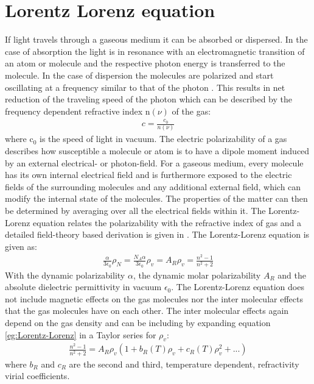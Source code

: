 \section{Lorentz Lorenz equation}
If light travels through a gaseous medium it can be absorbed or dispersed. In the case of absorption the light is in resonance with an electromagnetic transition of an atom or molecule and the respective photon energy is transferred to the molecule. In the case of dispersion the molecules are polarized and start oscillating at a frequency similar to that of the photon \cite{Jousten-2017}. This results in net reduction of the traveling speed of the photon which can be described by the frequency dependent refractive index n$(\nu)$ of the gas:
\begin{align}
	c=\frac{c_0}{n(\nu)}
	\label{eq:refractive_index}
\end{align} 
where c$_0$ is the speed of light in vacuum. The electric polarizability of a gas describes how susceptible a molecule or atom is to have a dipole moment induced by an external electrical- or photon-field. For a gaseous medium, every molecule has its own internal electrical field and is furthermore exposed to the electric fields of the surrounding molecules and any additional external field, which can modify the internal state of the molecules. The properties of the matter can then be determined by averaging over all the electrical fields within it. The Lorentz-Lorenz equation relates the polarizability with the refractive index of gas and a detailed field-theory based derivation is given in \cite{Born-1980}. The Lorentz-Lorenz equation is given as:
\begin{align}
	\frac{\alpha}{3 \epsilon_0}\rho_N=\frac{N_A\alpha}{3 \epsilon_0}\rho_v=A_R\rho_v=\frac{n^2-1}{n^2+2}
	\label{eg:Lorentz-Lorenz}
\end{align}
With the dynamic polarizability $\alpha$, the dynamic molar polarizability $A_R$ and the absolute dielectric permittivity in vacuum $\epsilon_0$. The Lorentz-Lorenz equation does not include magnetic effects on the gas  molecules nor the inter molecular effects that the gas molecules have on each other. The inter molecular effects again depend on the gas density and can be including by expanding equation \ref{eg:Lorentz-Lorenz} in a Taylor series for $\rho_v$:
\begin{align}
	\frac{n^2-1}{n^2+2}=A_R\rho_v(1+b_R(T)\rho_v+c_R(T)\rho_v^2+...)
	\label{eg:Lorentz-Lorenz_1}
\end{align}
where $b_R$ and $c_R$ are the second and third, temperature dependent, refractivity virial coefficients.\\\\
